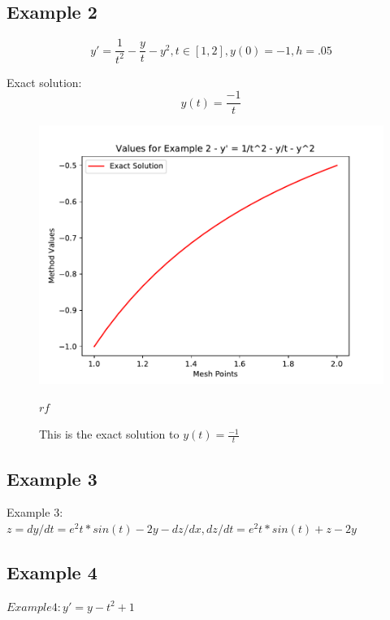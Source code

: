 \documentclass[11pt]{article}
\begin{document}
\subsection{Example 2}
\begin{equation}\label{ex:2:ivp}
y{'} = \frac{1}{t^2} - \frac{y}{t} - y^2, t \in [1,2], y(0) = -1, h = .05
\end{equation}

Exact solution:
\begin{equation}\label{ex:2:ivp}
y(t) = \frac{-1}{t}
\end{equation}
\begin{figure}
\centering
\includegraphics[width=.5\textwidth]{exact_solution_example_2.pdf}
\caption{This is the exact solution to $y(t)=\frac{-1}{t}$}
\label{fig:ex:2:solution}
$rf$
\end{figure}


\subsection{Example 3}
Example 3: 
$z = dy/dt = e^2t * sin(t) - 2y - dz/dx , dz/dt = e^2t * sin(t) + z - 2y$


\subsection{Example 4}
$Example 4: y' = y - t^2 + 1$
\end{document}
